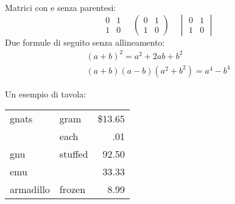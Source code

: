 Matrici con e senza parentesi:
\begin{equation*}
  \begin{matrix}
    0 & 1 \\
    1 & 0
  \end{matrix}\quad
  \begin{pmatrix}
    0 & 1 \\
    1 & 0
  \end{pmatrix}
  \quad
  \begin{vmatrix}
    0 & 1 \\
    1 & 0
  \end{vmatrix}
\end{equation*}
Due formule di seguito senza allineamento:
\begin{gather}
  (a+b)^2=a^2+2ab+b^2\label{eq:quadrato} \\
  (a+b)(a-b)(a^2+b^2)=a^4-b^4
\end{gather}

Un esempio di tavola:

\begin{center}
\begin{tabular}{||l|lr||} \hline
gnats & gram & \$13.65 \\ \cline{2-3}
      & each &      .01 \\ \hline
gnu   & stuffed & 92.50 \\
    \cline{3-3}
emu   &      & 33.33 \\ \hline
armadillo & frozen & 8.99 \\ \hline
\end{tabular}
\end{center}